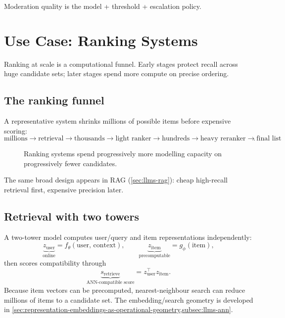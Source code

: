 \begin{calloutmemoryhook}
Moderation quality is the model + threshold + escalation policy.
\end{calloutmemoryhook}

\section{Use Case: Ranking Systems}
\label{chap:ranking}
Ranking at scale is a computational funnel.
Early stages protect recall across huge candidate sets; later stages spend more compute on precise ordering.

\subsection{The ranking funnel}
\label{sec:ranking-funnel}
A representative system shrinks millions of possible items before expensive scoring:
\[
\boxed{
\text{millions}
\rightarrow
\text{retrieval}
\rightarrow
\text{thousands}
\rightarrow
\text{light ranker}
\rightarrow
\text{hundreds}
\rightarrow
\text{heavy reranker}
\rightarrow
\text{final list}
}.
\]

\begin{figure}[htbp]
\centering
{}
\caption{Ranking systems spend progressively more modelling capacity on progressively fewer candidates.}
\end{figure}

The same broad design appears in RAG (\cref{sec:llms-rag}): cheap high-recall retrieval first, expensive precision later.

\subsection{Retrieval with two towers}
\label{sec:ranking-retrieval}
A two-tower model computes user/query and item representations independently:
\[
\underbrace{z_{\text{user}}}_{\text{online}}
=f_{\theta}(\text{user, context}),
\qquad
\underbrace{z_{\text{item}}}_{\text{precomputable}}
=g_{\phi}(\text{item}),
\]
then scores compatibility through
\[
\underbrace{s_{\text{retrieve}}}_{\text{ANN-compatible score}}
=
z_{\text{user}}^\top z_{\text{item}}.
\]
Because item vectors can be precomputed, nearest-neighbour search can reduce millions of items to a candidate set.
The embedding/search geometry is developed in \cref{sec:representation-embeddings-as-operational-geometry,subsec:llms-ann}.

